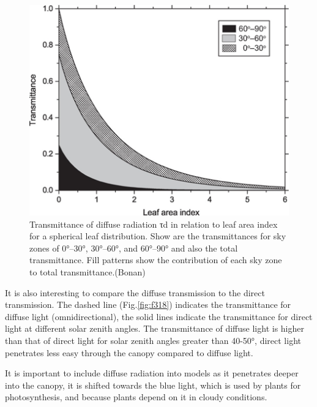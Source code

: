 \documentclass[
  12pt,
  oneside]{book}
\begin{document}
\begin{figure}

{\centering \includegraphics[width=0.8\linewidth]{figures/chap3/f317_diff_trans} 

}

\caption{Transmittance of diffuse radiation τd in relation to leaf area index for a spherical leaf distribution. Show are the transmittances for sky zones of 0°–30°, 30°–60°, and 60°–90° and also the total transmittance. Fill patterns show the contribution of each sky zone to total transmittance.(Bonan)}\label{fig:f317}
\end{figure}

It is also interesting to compare the diffuse transmission to the direct transmission. The dashed line (Fig.\ref{fig:f318}) indicates the transmittance for diffuse light (omnidirectional), the solid lines indicate the transmittance for direct light at different solar zenith angles. The transmittance of diffuse light is higher than that of direct light for solar zenith angles greater than 40-50°, direct light penetrates less easy through the canopy compared to diffuse light.

It is important to include diffuse radiation into models as it penetrates deeper into the canopy, it is shifted towards the blue light, which is used by plants for photosynthesis, and because plants depend on it in cloudy conditions.
\end{document}
